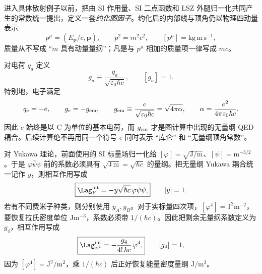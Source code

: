 
进入具体散射例子以前，把由 SI 作用量、SI 二点函数和 LSZ 外腿归一化共同产生的常数统一提出，定义一套\emph{约化图因子}。约化后的内部线与顶角仍以物理四动量表示
\begin{equation}
 p^\mu=(E_{\mathbf p}/c,\mathbf p),
 \qquad p^2=m^2c^2,
 \qquad [p^\mu]=\mathrm{kg\,m\,s^{-1}},
 \label{eq:reduced-si-physical-p-r10}
\end{equation}
质量从不写成 ``$m$ 具有动量量纲''；凡是与 $p^\mu$ 相加的质量项一律写成 $mc$。

对电荷 $q_a$ 定义
\begin{equation}
 g_a\equiv\frac{q_a}{\sqrt{\varepsilon_0\hbar c}},
 \qquad
 [g_a]=1.
 \label{eq:si-reduced-charge-coupling-r10}
\end{equation}
特别地，电子满足
\begin{equation}
 q_{\mathrm e}=-e,
 \qquad
 g_e=-g_{\rm em},
 \qquad
 g_{\rm em}\equiv\frac{e}{\sqrt{\varepsilon_0\hbar c}}
 =\sqrt{4\pi\alpha},
 \qquad
 \alpha=\frac{e^2}{4\pi\varepsilon_0\hbar c}.
 \label{eq:gem-alpha-si-r10}
\end{equation}
因此 $e$ 始终是以 C 为单位的基本电荷，而 $g_{\rm em}$ 才是图计算中出现的无量纲 QED 耦合。后续计算绝不再用同一个符号 $e$ 同时表示 ``库仑'' 和 ``无量纲顶角常数''。


对 Yukawa 理论，前面使用的 SI 标量场归一化给 $[\varphi]=\sqrt{\mathrm{J/m}}$、$[\psi]=\mathrm{m^{-3/2}}$。于是 $\varphi\bar\psi\psi$ 前的系数必须具有 $\sqrt{\mathrm{J\,m}}=\sqrt{\hbar c}$ 的量纲。把无量纲 Yukawa 耦合统一记作 $y$，则相互作用写成
\begin{equation}
 \boxed{
 \Lag_Y^{\rm int}=-y\sqrt{\hbar c}\,\varphi\bar\psi\psi,}
 \qquad [y]=1.
 \label{eq:yukawa-si-coupling-r10}
\end{equation}
若有不同费米子种类，则分别使用 $y_A,y_B$。对于实标量四次项，$[\varphi^4]=\mathrm{J^2m^{-2}}$，要恢复拉氏密度单位 $\mathrm{Jm^{-3}}$，系数必须带 $1/(\hbar c)$。因此把剩余无量纲系数定义为 $g_4$，相互作用写成
\begin{equation}
 \boxed{
 \Lag_{\varphi^4}^{\rm int}
 =-\frac{g_4}{4!\,\hbar c}\,\varphi^4,}
 \qquad [g_4]=1,
 \label{eq:phi4-si-coupling-r10}
\end{equation}
因为 $[\varphi^4]=\mathrm{J^2/m^2}$，乘 $1/(\hbar c)$ 后正好恢复能量密度量纲 $\mathrm{J/m^3}$。

